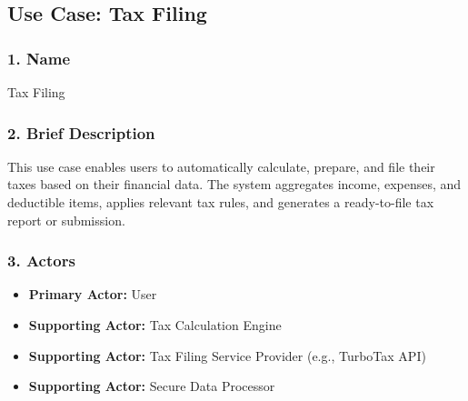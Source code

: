 \newpage

\subsection*{Use Case: Tax Filing}
\begin{useCase}
\end{useCase}

\subsubsection*{1. Name}
Tax Filing

\subsubsection*{2. Brief Description}
This use case enables users to automatically calculate, prepare, and file their taxes based on their financial data. The system aggregates income, expenses, and deductible items, applies relevant tax rules, and generates a ready-to-file tax report or submission.

\subsubsection*{3. Actors}
\begin{itemize}
    \item \textbf{Primary Actor:} User
    \item \textbf{Supporting Actor:} Tax Calculation Engine
    \item \textbf{Supporting Actor:} Tax Filing Service Provider (e.g., TurboTax API)
    \item \textbf{Supporting Actor:} Secure Data Processor
\end{itemize}

